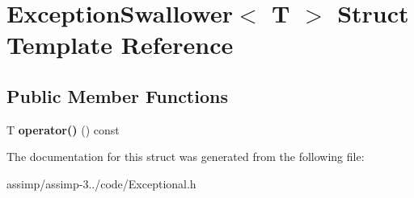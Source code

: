 \hypertarget{struct_exception_swallower}{\section{Exception\+Swallower$<$ T $>$ Struct Template Reference}
\label{struct_exception_swallower}
}
\subsection*{Public Member Functions}
\begin{DoxyCompactItemize}
\item 
\hypertarget{struct_exception_swallower_a0c3f73bf37773afb25979a935ea6184c}{T {\bfseries operator()} () const }\label{struct_exception_swallower_a0c3f73bf37773afb25979a935ea6184c}

\end{DoxyCompactItemize}


The documentation for this struct was generated from the following file\+:\begin{DoxyCompactItemize}
\item 
assimp/assimp-\/3../code/Exceptional.\+h\end{DoxyCompactItemize}
